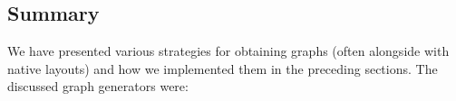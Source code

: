 \documentclass{graphstudy}
\begin{document}
\begin{Figure}
  \begin{center}
  \end{center}
  
  \caption[Example of a  graph]{%
    Example of a graph with \(\GraphNodes\) nodes and \(\GraphEdges\) edges output by the  generator
    (native layout).
  }
  \label{fig:bottle}
\end{Figure}

\subsection{Summary}

We have presented various strategies for obtaining graphs (often alongside with native layouts) and how we implemented
them in the preceding sections.  The discussed graph generators were:
\end{document}
